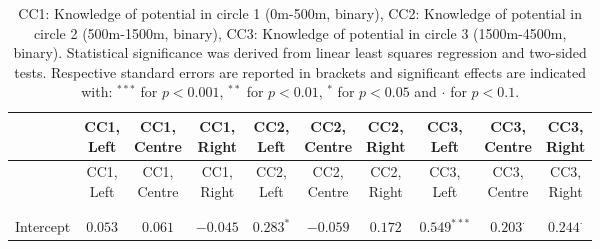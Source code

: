 
\begin{center}
\begin{small}
\begin{longtable}{l@{} c@{} c@{} c@{} c@{} c@{} c@{} c@{} c@{} c@{}}
\hline
 & \shortstack{\rule{0pt}{2.2ex}CC1,\\Left} & \shortstack{\rule{0pt}{2.2ex}CC1,\\Centre} & \shortstack{\rule{0pt}{2.2ex}CC1,\\Right} & \shortstack{\rule{0pt}{2.2ex}CC2,\\Left} & \shortstack{\rule{0pt}{2.2ex}CC2,\\Centre} & \shortstack{\rule{0pt}{2.2ex}CC2,\\Right} & \shortstack{\rule{0pt}{2.2ex}CC3,\\Left} & \shortstack{\rule{0pt}{2.2ex}CC3,\\Centre} & \shortstack{\rule{0pt}{2.2ex}CC3,\\Right} \\
\hline
\endfirsthead
\hline
 & \shortstack{\rule{0pt}{2.2ex}CC1,\\Left} & \shortstack{\rule{0pt}{2.2ex}CC1,\\Centre} & \shortstack{\rule{0pt}{2.2ex}CC1,\\Right} & \shortstack{\rule{0pt}{2.2ex}CC2,\\Left} & \shortstack{\rule{0pt}{2.2ex}CC2,\\Centre} & \shortstack{\rule{0pt}{2.2ex}CC2,\\Right} & \shortstack{\rule{0pt}{2.2ex}CC3,\\Left} & \shortstack{\rule{0pt}{2.2ex}CC3,\\Centre} & \shortstack{\rule{0pt}{2.2ex}CC3,\\Right} \\
\hline
\endhead
\hline
\endfoot
\hline
\multicolumn{10}{l}{\tiny{
}}\\
\caption{CC1: Knowledge of potential in circle 1 (0m-500m, binary), CC2: Knowledge of potential in circle 2 (500m-1500m, binary), CC3: Knowledge of potential in circle 3 (1500m-4500m, binary).
                Statistical significance was derived from linear least squares regression and two-sided tests. 
                Respective standard errors are reported in brackets and significant effects are indicated with: $^{***}$ for $p < 0.001$, $^{**}$ for $p < 0.01$, $^*$ for $p < 0.05$ and $\cdot$ for $p < 0.1$.}
\label{table:coefficients}
\endlastfoot \\
Intercept                           & $0.053$         & $0.061$         & $-0.045$        & $0.283^{*}$      & $-0.059$      & $0.172$          & $0.549^{***}$    & $0.203^{\cdot}$  & $0.244^{\cdot}$  \\

\end{longtable}
\end{small}
\end{center}
